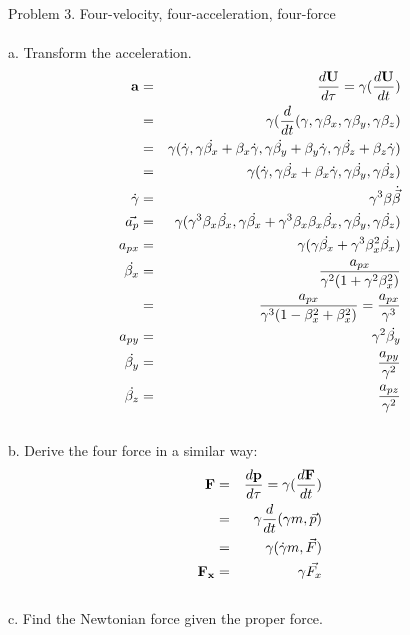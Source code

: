 \documentclass[11pt]{amsart}
\begin{document}
Problem 3. Four-velocity, four-acceleration, four-force	 \\ \\
a. Transform the acceleration. \\
\begin{eqnarray*}
\bold{a} &=& \frac{d\bold{U}}{d\tau} = \gamma(\frac{d\bold{U}}{dt}) \\
&=& \gamma(\frac{d}{dt}(\gamma, \gamma\beta_{x}, \gamma\beta_{y}, \gamma\beta_{z}) \\
&=& \gamma(\dot{\gamma}, \gamma\dot{\beta_{x}}+\beta_{x}\dot{\gamma}, \gamma\dot{\beta_{y}}+\beta_{y}\dot{\gamma}, \gamma\dot{\beta_{z}}+\beta_{z}\dot{\gamma}) \\
&=& \gamma(\dot{\gamma}, \gamma\dot{\beta_{x}}+\beta_{x}\dot{\gamma}, \gamma\dot{\beta_{y}}, \gamma\dot{\beta_{z}}) \\
\dot{\gamma} &=& \gamma^{3}\beta\dot{\vec{\beta}} \\
\vec{a_{p}} &=& \gamma(\gamma^{3}\beta_{x}\dot{\beta_{x}}, \gamma\dot{\beta_{x}}+\gamma^{3}\beta_{x}\beta_{x}\dot{\beta_{x}}, \gamma\dot{\beta_{y}}, \gamma\dot{\beta_{z}}) \\
a_{px} &=& \gamma(\gamma\dot{\beta_{x}}+\gamma^{3}\beta_{x}^{2}\dot{\beta_{x}}) \\
\dot{\beta_{x}} &=& \frac{a_{px}}{\gamma^{2}(1+\gamma^{2}\beta_{x}^{2})} \\
&=& \frac{a_{px}}{\gamma^{3}(1-\beta_{x}^{2}+\beta_{x}^{2})} = \frac{a_{px}}{\gamma^{3}} \\
a_{py} &=& \gamma^{2}\dot{\beta_{y}} \\
\dot{\beta_{y}} &=& \frac{a_{py}}{\gamma^{2}} \\
\dot{\beta_{z}} &=& \frac{a_{pz}}{\gamma^{2}} 
\end{eqnarray*} \\
b. Derive the four force in a similar way: \\
\begin{eqnarray*}
\bold{F} &=& \frac{d\bold{p}}{d\tau} = \gamma(\frac{d\bold{F}}{dt}) \\
&=& \gamma\frac{d}{dt}(\gamma{m}, \vec{p}) \\
&=& \gamma(\dot{\gamma}m, \vec{F}) \\
\bold{F_{x}} &=& \gamma\vec{F_{x}} 
\end{eqnarray*} \\
c. Find the Newtonian force given the proper force. \\
\end{document}
